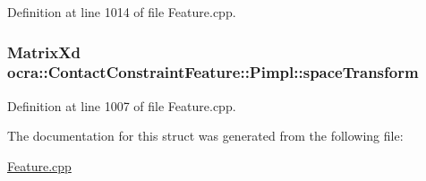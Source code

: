 Definition at line 1014 of file Feature.\+cpp.

\subsubsection[{\texorpdfstring{space\+Transform}{spaceTransform}}]{\setlength{\rightskip}{0pt plus 5cm}Matrix\+Xd ocra\+::\+Contact\+Constraint\+Feature\+::\+Pimpl\+::space\+Transform}\hypertarget{structocra_1_1ContactConstraintFeature_1_1Pimpl_a3b33ee6094ed308df598785b4a75416c}{}\label{structocra_1_1ContactConstraintFeature_1_1Pimpl_a3b33ee6094ed308df598785b4a75416c}


Definition at line 1007 of file Feature.\+cpp.



The documentation for this struct was generated from the following file\+:\begin{DoxyCompactItemize}
\item 
\hyperlink{Feature_8cpp}{Feature.\+cpp}\end{DoxyCompactItemize}

